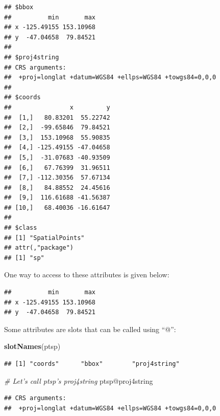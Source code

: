 \documentclass[]{report}
\newenvironment{Shaded}{\begin{snugshade}}{\end{snugshade}}
\newcommand{\KeywordTok}[1]{\textcolor[rgb]{0.13,0.29,0.53}{\textbf{{#1}}}}
\newcommand{\CommentTok}[1]{\textcolor[rgb]{0.56,0.35,0.01}{\textit{{#1}}}}
\newcommand{\NormalTok}[1]{{#1}}
\begin{document}
\begin{verbatim}
## $bbox
##          min       max
## x -125.49155 153.10968
## y  -47.04658  79.84521
## 
## $proj4string
## CRS arguments:
##  +proj=longlat +datum=WGS84 +ellps=WGS84 +towgs84=0,0,0 
## 
## $coords
##                x         y
##  [1,]   80.83201  55.22742
##  [2,]  -99.65846  79.84521
##  [3,]  153.10968  55.90835
##  [4,] -125.49155 -47.04658
##  [5,]  -31.07683 -40.93509
##  [6,]   67.76399  31.96511
##  [7,] -112.30356  57.67134
##  [8,]   84.88552  24.45616
##  [9,]  116.61688 -41.56387
## [10,]   68.40036 -16.61647
## 
## $class
## [1] "SpatialPoints"
## attr(,"package")
## [1] "sp"
\end{verbatim}

One way to access to these attributes is given below:

\begin{Shaded}
\end{Shaded}

\begin{verbatim}
##          min       max
## x -125.49155 153.10968
## y  -47.04658  79.84521
\end{verbatim}

Some attributes are slots that can be called using ``@'':

\begin{Shaded}
\begin{Highlighting}[]
\KeywordTok{slotNames}\NormalTok{(ptsp)}
\end{Highlighting}
\end{Shaded}

\begin{verbatim}
## [1] "coords"      "bbox"        "proj4string"
\end{verbatim}

\begin{Shaded}
\begin{Highlighting}[]
\CommentTok{# Let's call ptsp's proj4string}
\NormalTok{ptsp@proj4string}
\end{Highlighting}
\end{Shaded}

\begin{verbatim}
## CRS arguments:
##  +proj=longlat +datum=WGS84 +ellps=WGS84 +towgs84=0,0,0
\end{verbatim}
\end{document}

